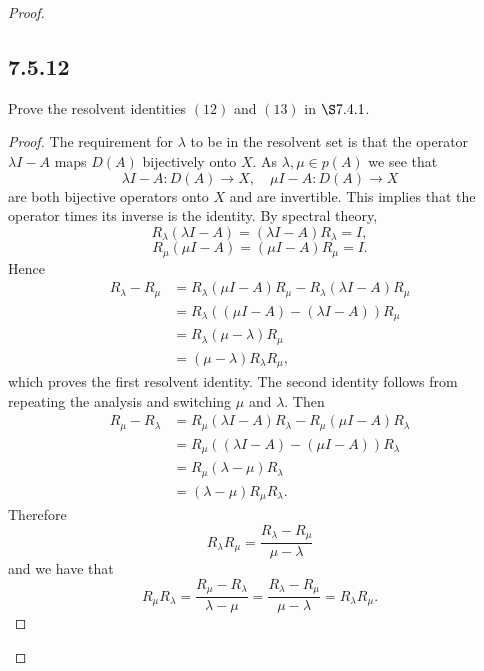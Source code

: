 \documentclass{article}
\begin{document}
\begin{flushleft}
\begin{proof}
\subsection{\textbf{7.5.12}} Prove the resolvent identities $(12)$ and $(13)$ in $\S7.4.1$.
\begin{proof}The requirement for $\lambda$ to be in the resolvent set is that the operator $\lambda I-A$ maps $D(A)$ bijectively onto $X$. As $\lambda,\mu \in p(A)$ we see that
$$\lambda I - A:D(A) \to X,\quad \mu I - A:D(A) \to X$$
are both bijective operators onto $X$ and are invertible. This implies that the operator times its inverse is the identity. By spectral theory,
$$R_{\lambda}(\lambda I - A)=(\lambda I - A)R_{\lambda} =I,$$
$$R_{\mu}(\mu I - A)= (\mu I - A)R_{\mu}= I.$$
Hence
\begin{align*}
    R_{\lambda}-R_{\mu} &= R_{\lambda} (\mu I-A) R_{\mu} - R_{\lambda}(\lambda I-A) R_{\mu} \\ &= 
    R_{\lambda} ((\mu I-A)-(\lambda I-A)) R_{\mu} \\&=
    R_{\lambda}(\mu - \lambda)R_{\mu} \\&=
    (\mu - \lambda)R_{\lambda}R_{\mu},
\end{align*}
which proves the first resolvent identity. The second identity follows from repeating the analysis and switching $\mu$ and $\lambda$. Then
\begin{align*}
    R_{\mu}-R_{\lambda} &= R_{\mu} (\lambda I-A) R_{\lambda} - R_{\mu}(\mu I-A) R_{\lambda} \\ &= 
    R_{\mu} ((\lambda I-A)-(\mu I-A)) R_{\lambda} \\&=
    R_{\mu}(\lambda - \mu)R_{\lambda} \\&=
    (\lambda- \mu)R_{\mu}R_{\lambda}.
\end{align*}
Therefore
$$R_{\lambda}R_{\mu}=\frac{R_{\lambda}-R_{\mu}}{\mu - \lambda}$$
and we have that
$$R_{\mu}R_{\lambda}=\frac{R_{\mu}-R_{\lambda}}{\lambda- \mu}=\frac{R_{\lambda}-R_{\mu}}{\mu - \lambda}=R_{\lambda}R_{\mu}.$$
\end{proof}

\end{proof}
\end{flushleft}
\end{document}
